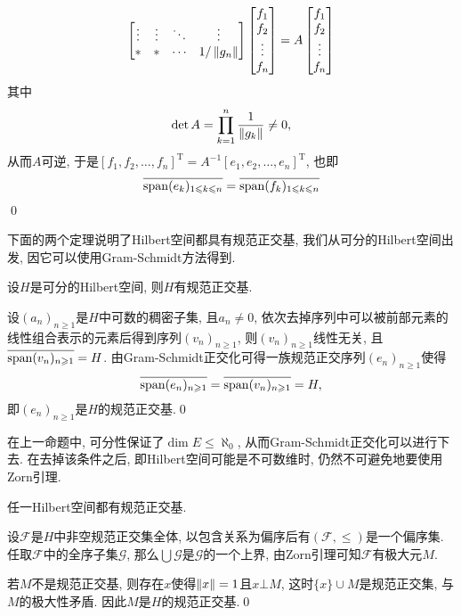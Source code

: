 \begin{Proof}
\[\begin{bmatrix}
    \vdots & \vdots & \ddots & \vdots\\
    \ast & \ast & \cdots & 1/\left\| g_n \right\|
    \end{bmatrix}\begin{bmatrix}
    f_1\\f_2\\\vdots\\f_n
    \end{bmatrix}=A\begin{bmatrix}
    f_1\\f_2\\\vdots\\f_n
    \end{bmatrix}
    \]
    其中
    \[
    \det A=\prod_{k=1}^n\frac{1}{\left\| g_k \right\|}\ne 0,
    \]
    从而$ A $可逆, 于是$ [f_1,f_2, \dots,f_n]^\mathrm T=A^{-1}[e_1,e_2, \dots,e_n]^\mathrm T $, 也即
    \[
    \overline{\operatorname{span}(e_k)_{1\leqslant k\leqslant n}}=\overline{\operatorname{span}(f_k)_{1\leqslant k\leqslant n}}
    \]
    \qed
    \end{Proof}
    
    下面的两个定理说明了Hilbert空间都具有规范正交基, 我们从可分的Hilbert空间出发, 因它可以使用Gram-Schmidt方法得到.
    
    \begin{Proposition}
    设$ H $是可分的Hilbert空间, 则$ H $有规范正交基.
    \end{Proposition}
    \begin{Proof}
    设$ (a_n)_{n\geqslant 1} $是$ H $中可数的稠密子集, 且$ a_n\ne 0 $, 依次去掉序列中可以被前部元素的线性组合表示的元素后得到序列$ (v_n)_{n\geqslant 1} $, 则$ (v_n)_{n\geqslant 1} $线性无关, 且$ \overline{\operatorname{span}(v_n)_{n\geqslant 1}}=H $. 由Gram-Schmidt正交化可得一族规范正交序列$ (e_n)_{n\geqslant 1} $使得
    \[
    \overline{\operatorname{span}(e_n)_{n\geqslant 1}}=\overline{\operatorname{span}(v_n)_{n\geqslant 1}}=H,
    \]
    即$ (e_n)_{n\geqslant 1} $是$ H $的规范正交基.\qed
    \end{Proof}
    在上一命题中, 可分性保证了$ \dim E\leqslant\aleph_0 $, 从而Gram-Schmidt正交化可以进行下去. 在去掉该条件之后, 即Hilbert空间可能是不可数维时, 仍然不可避免地要使用Zorn引理.
    
    \begin{Theorem}
    任一Hilbert空间都有规范正交基.
    \end{Theorem}
    \begin{Proof}
    设$ \mathcal F $是$ H $中非空规范正交集全体, 以包含关系为偏序后有$ (\mathcal F,\leqslant) $是一个偏序集. 任取$ \mathcal F $中的全序子集$ \mathcal G $, 那么$ \bigcup\mathcal G $是$ \mathcal G $的一个上界, 由Zorn引理可知$ \mathcal F $有极大元$ M $.
    
    若$ M $不是规范正交基, 则存在$ x $使得$ \left\| x \right\|=1 $且$ x\bot M $, 这时$ \{ x \}\cup M $是规范正交集, 与$ M $的极大性矛盾. 因此$ M $是$ H $的规范正交基.\qed
    \end{Proof}
    
